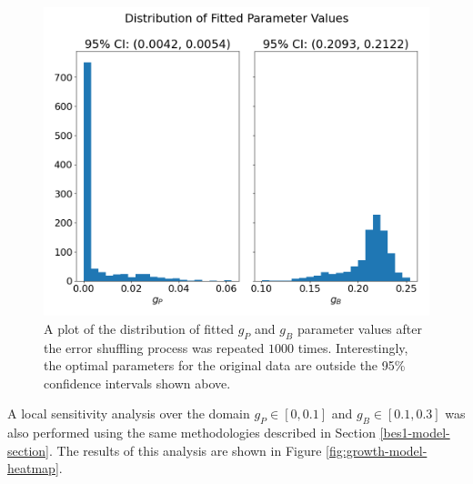 \begin{figure}[!hbt]
    \centering
    \includegraphics[width=13cm]{img/growth-model-uncertainty.png}
    \caption{A plot of the distribution of fitted $g_{P}$ and $g_{B}$ parameter values after the error shuffling process was repeated $1000$ times. Interestingly, the optimal parameters for the original data are outside the 95\% confidence intervals shown above. }
    \label{fig:growth-model-uncertainty}
\end{figure}

\medskip

A local sensitivity analysis over the domain $g_{P} \in [0, 0.1]$ and $g_{B} \in [0.1, 0.3]$ was also performed using the same methodologies described in Section \ref{bes1-model-section}. The results of this analysis are shown in Figure \ref{fig:growth-model-heatmap}.


